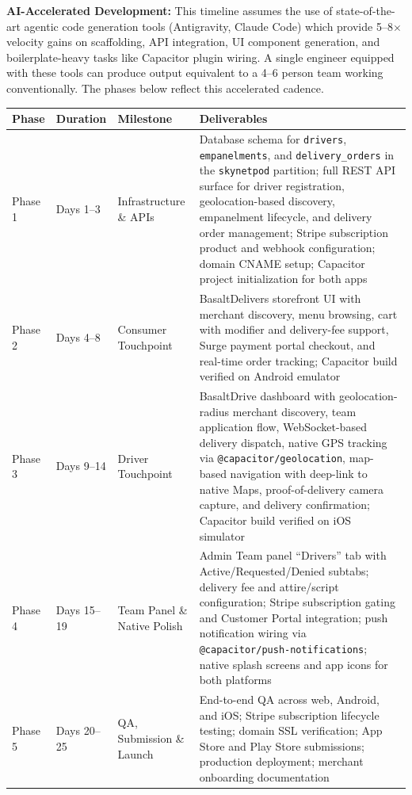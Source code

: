 \documentclass[11pt, letterpaper]{article}
\begin{document}
\begin{warningbox}
\textbf{AI-Accelerated Development:} This timeline assumes the use of state-of-the-art agentic code generation tools (Antigravity, Claude Code) which provide 5--8$\times$ velocity gains on scaffolding, API integration, UI component generation, and boilerplate-heavy tasks like Capacitor plugin wiring. A single engineer equipped with these tools can produce output equivalent to a 4--6 person team working conventionally. The phases below reflect this accelerated cadence.
\end{warningbox}

\begin{center}
\begin{tabularx}{\textwidth}{@{}l l l X@{}}
\toprule
\textbf{Phase} & \textbf{Duration} & \textbf{Milestone} & \textbf{Deliverables} \\
\midrule
Phase 1 & Days 1--3 & Infrastructure \& APIs & Database schema for \texttt{drivers}, \texttt{empanelments}, and \texttt{delivery\_orders} in the \texttt{skynetpod} partition; full REST API surface for driver registration, geolocation-based discovery, empanelment lifecycle, and delivery order management; Stripe subscription product and webhook configuration; domain CNAME setup; Capacitor project initialization for both apps \\
Phase 2 & Days 4--8 & Consumer Touchpoint & BasaltDelivers storefront UI with merchant discovery, menu browsing, cart with modifier and delivery-fee support, Surge payment portal checkout, and real-time order tracking; Capacitor build verified on Android emulator \\
Phase 3 & Days 9--14 & Driver Touchpoint & BasaltDrive dashboard with geolocation-radius merchant discovery, team application flow, WebSocket-based delivery dispatch, native GPS tracking via \texttt{@capacitor/geolocation}, map-based navigation with deep-link to native Maps, proof-of-delivery camera capture, and delivery confirmation; Capacitor build verified on iOS simulator \\
Phase 4 & Days 15--19 & Team Panel \& Native Polish & Admin Team panel ``Drivers'' tab with Active/Requested/Denied subtabs; delivery fee and attire/script configuration; Stripe subscription gating and Customer Portal integration; push notification wiring via \texttt{@capacitor/push-notifications}; native splash screens and app icons for both platforms \\
Phase 5 & Days 20--25 & QA, Submission \& Launch & End-to-end QA across web, Android, and iOS; Stripe subscription lifecycle testing; domain SSL verification; App Store and Play Store submissions; production deployment; merchant onboarding documentation \\
\bottomrule
\end{tabularx}
\end{center}
\end{document}
